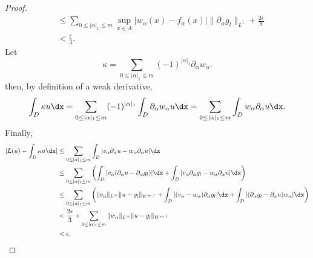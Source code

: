 \begin{proof}
\begin{align*}
&\leq \sum_{0 \leq |\alpha|_1 \leq m} \sup_{x \in A} |w_\alpha (x) - f_\alpha (x)| \|\partial_\alpha g_l\|_{L^1} + \frac{2\epsilon}{9}   \\ 
&< \frac{\epsilon}{3}.
\end{align*}
Let
\[\kappa = \sum_{0 \leq |\alpha|_1 \leq m} (-1)^{|\alpha|_1} \partial_\alpha w_\alpha.\]
then, by definition of a weak derivative, 
\[\int_D \kappa u \dx = \sum_{0 \leq |\alpha|_1 \leq m} (-1)^{|\alpha|_1} \int_D \partial_\alpha w_\alpha  u \dx = \sum_{0 \leq |\alpha|_1 \leq m} \int_D w_\alpha \partial_\alpha u \dx.  \]
Finally,
\begin{align*}
|L(u) - \int_{D} \kappa u \dx| &\leq \sum_{0 \leq |\alpha|_1 \leq m} \int_D | v_\alpha \partial_\alpha u - w_\alpha \partial_\alpha u| \dx \\
&\leq \sum_{0 \leq |\alpha|_1 \leq m} \left ( \int_D |v_\alpha (\partial_\alpha u - \partial_\alpha g_l)| \dx + \int_D |v_\alpha \partial_\alpha g_l - w_\alpha \partial_\alpha u| \dx \right ) \\
&\leq \sum_{0 \leq |\alpha|_1 \leq m} \left ( \|v_\alpha\|_{L^\infty} \|u - g_l\|_{W^{m,1}} +  \int_D |(v_\alpha - w_\alpha) \partial_\alpha g_l| \dx + \int_D |(\partial_\alpha g_l - \partial_\alpha u) w_\alpha| \dx \right ) \\
&< \frac{2\epsilon}{3} + \sum_{0 \leq |\alpha|_1 \leq m} \|w_\alpha\|_{L^\infty} \|u - g_l\|_{W^{m,1}} \\
&< \epsilon.
\end{align*}

\end{proof}

